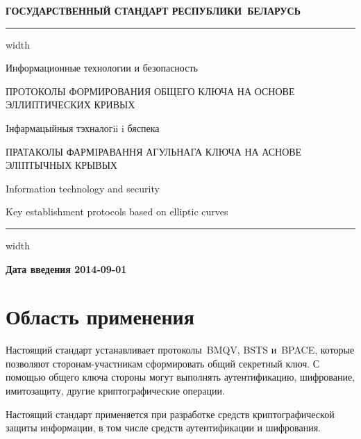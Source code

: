 \newpage
\setcounter{page}{1}

\begin{center}
{\bfseries
ГОСУДАРСТВЕННЫЙ СТАНДАРТ РЕСПУБЛИКИ~БЕЛАРУСЬ
\vskip 2pt
\hrule width\textwidth

\vskip 9pt

Информационные технологии и безопасность

ПРОТОКОЛЫ ФОРМИРОВАНИЯ ОБЩЕГО КЛЮЧА
НА ОСНОВЕ ЭЛЛИПТИЧЕСКИХ КРИВЫХ

\vskip 9pt

Iнфармацыйныя тэхналогii i бяспека

ПРАТАКОЛЫ ФАРМIРАВАННЯ АГУЛЬНАГА КЛЮЧА
НА АСНОВЕ ЭЛIПТЫЧНЫХ КРЫВЫХ
} %

\vskip 9pt

Information technology and security

Key establishment protocols based on elliptic curves

\vskip 4pt                
\hrule width \textwidth
\end{center}

\mbox{}\hfill{\bfseries Дата введения 2014-09-01}

\chapter{Область применения}

Настоящий стандарт устанавливает протоколы~BMQV, BSTS и~BPACE,
которые позволяют сторонам-участникам сформировать общий секретный ключ.
%
С помощью общего ключа стороны могут выполнять аутентификацию,
шифрование, имитозащиту, другие криптографические операции.

Настоящий стандарт применяется при разработке средств криптографической
защиты информации, в том числе средств аутентификации и шифрования.


